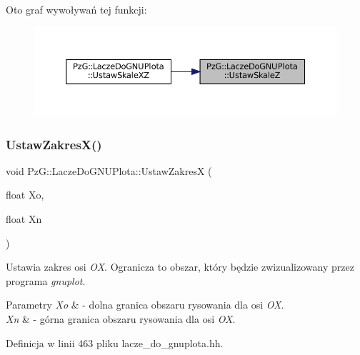 Oto graf wywoływań tej funkcji\+:\nopagebreak
\begin{figure}[H]
\begin{center}
\leavevmode
\includegraphics[width=350pt]{class_pz_g_1_1_lacze_do_g_n_u_plota_ab0486db3166d8db6580a221079af241f_icgraph}
\end{center}
\end{figure}
\mbox{\label{class_pz_g_1_1_lacze_do_g_n_u_plota_a9c91987dfc869d6fcea96205c581daef}} 
\subsubsection{\texorpdfstring{UstawZakresX()}{UstawZakresX()}}
{\footnotesize\ttfamily void Pz\+G\+::\+Lacze\+Do\+G\+N\+U\+Plota\+::\+Ustaw\+ZakresX (\begin{DoxyParamCaption}\item[{float}]{Xo,  }\item[{float}]{Xn }\end{DoxyParamCaption})\hspace{0.3cm}{\ttfamily [inline]}}

Ustawia zakres osi {\itshape OX}. Ogranicza to obszar, który będzie zwizualizowany przez programa {\itshape gnuplot}. 
\begin{DoxyParams}{Parametry}
{\em Xo} & -\/ dolna granica obszaru rysowania dla osi {\itshape OX}. \\
\hline
{\em Xn} & -\/ górna granica obszaru rysowania dla osi {\itshape OX}. \\
\hline
\end{DoxyParams}


Definicja w linii 463 pliku lacze\+\_\+do\+\_\+gnuplota.\+hh.


